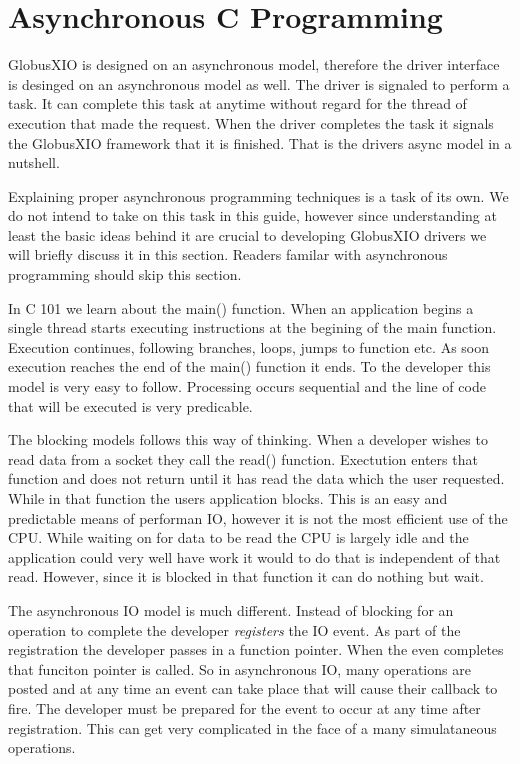 \documentclass[11pt]{article}
\begin{document}
\section{Asynchronous C Programming}
GlobusXIO is designed on an asynchronous model, therefore
the driver interface is desinged on an asynchronous model as well.
The driver is signaled to perform a task.  It can complete this
task at anytime without regard for the thread of execution that
made the request.  When the driver completes the task it signals
the GlobusXIO framework that it is finished.  That is the drivers 
async model in a nutshell.  

Explaining
proper asynchronous programming techniques is a task of its own.  We
do not intend to take on this task in this guide, however since 
understanding at least the basic ideas behind it are crucial to 
developing GlobusXIO drivers we will briefly discuss it in this section.
Readers familar with asynchronous programming should skip this section.

In C 101 we learn about the main() function.  When an application 
begins a single thread starts executing instructions at the begining
of the main function.  Execution continues, following branches, loops,
jumps to function etc.  As soon execution reaches the end of the main()
function it ends.  To the developer this model is very easy to follow.
Processing occurs sequential and the line of code that will be executed
is very predicable.

The blocking models follows this way of thinking.  When a developer wishes
to read data from a socket they call the read() function.  Exectution 
enters that function and does not return until it has read the data which
the user requested.  While in that function the users application 
blocks.  This is an easy and predictable means of performan IO, however
it is not the most efficient use of the CPU.  While waiting on for data
to be read the CPU is largely idle and the application could very well
have work it would to do that is independent of that read.  However, since
it is blocked in that function it can do nothing but wait.

The asynchronous IO model is much different.  Instead of blocking
for an operation to complete the developer \emph{registers} the IO event.
As part of the registration the developer passes in a function pointer.
When the even completes that funciton pointer is called.  So in 
asynchronous IO, many operations are posted and at any time an event
can take place that will cause their callback to fire.  The developer
must be prepared for the event to occur at any time after registration.
This can get very complicated in the face of a many simulataneous
operations.
\end{document}
